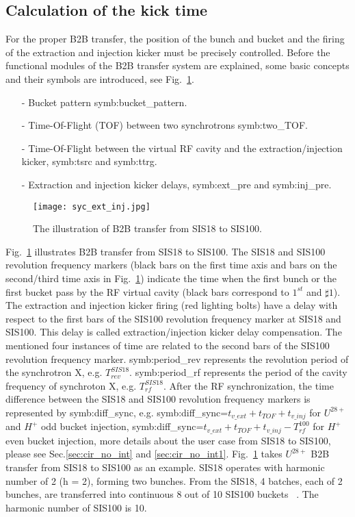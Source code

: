 \subsection{Calculation of the kick time}
For the proper B2B transfer, the position of the bunch and bucket and the firing of the extraction and injection kicker must be precisely controlled. Before the functional modules of the B2B transfer system are explained, some basic concepts and their symbols are introduced, see Fig.~\ref{ext_inj_kicker}.

\begin{itemize}
\item[-] Bucket pattern \gls{symb:bucket_pattern}.
\item[-] Time-Of-Flight (\gls{TOF}) between two synchrotrons \gls{symb:two_TOF}. 
\item[-] Time-Of-Flight between the virtual RF cavity and the extraction/injection kicker, \gls{symb:tsrc} and \gls{symb:ttrg}. 
\item[-] Extraction and injection kicker delays, \gls{symb:ext_pre} and \gls{symb:inj_pre}.
\end{itemize}
\begin{figure}[H]
   \centering   
   \texttt{[image: syc\_ext\_inj.jpg]}
   \caption{The illustration of B2B transfer from SIS18 to SIS100.}
   \label{ext_inj_kicker}
\end{figure}
Fig.~\ref{ext_inj_kicker} illustrates B2B transfer from SIS18 to SIS100. The SIS18 and SIS100 revolution frequency markers (black bars on the first time axis and bars on the second/third time axis in Fig.~\ref{ext_inj_kicker}) indicate the time when the first bunch or the first bucket pass by the RF virtual cavity (black bars correspond to $1^{st}$ and $\sharp1$). The extraction and injection kicker firing (red lighting bolts) have a delay with respect to the first bars of the SIS100 revolution frequency marker at SIS18 and SIS100. This delay is called extraction/injection kicker delay compensation. The mentioned four instances of time are related to the second bars of the SIS100 revolution frequency marker. \gls{symb:period_rev} represents the revolution period of the synchrotron X, e.g. $T_{rev}^{SIS18}$. \gls{symb:period_rf} represents the period of the cavity frequency of synchroton X, e.g. $T_{rf}^{SIS18}$. After the RF synchronization, the time difference between the SIS18 and SIS100 revolution frequency markers is represented by \gls{symb:diff_sync}, e.g. \gls{symb:diff_sync}=$t_{v\_ext}+t_{TOF}+t_{v\_inj}$ for $U^{28+}$ and $H^{+}$ odd bucket injection,  \gls{symb:diff_sync}=$t_{v\_ext}+t_{TOF}+t_{v\_inj}- T_{rf}^{100}$ for $H^{+}$ even bucket injection, more details about the user case from SIS18 to SIS100, please see Sec.\ref{sec:cir_no_int} and \ref{sec:cir_no_int1}. Fig.~\ref{ext_inj_kicker} takes $U^{28+}$ B2B transfer from SIS18 to SIS100 as an example. SIS18 operates with harmonic number of 2 (h = 2), forming two bunches. From the SIS18, 4 batches, each of 2 bunches, are transferred into continuous 8 out of 10 SIS100 buckets ~\cite{liebermann_fair_2013, liebermann_sis100_2013}. The harmonic number of SIS100 is 10. 


